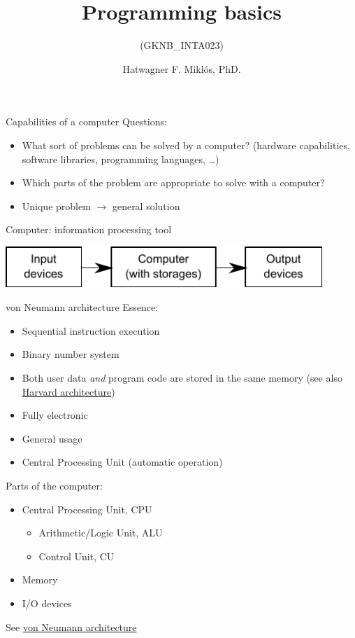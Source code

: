 \documentclass[usenames,dvipsnames,aspectratio=169]{beamer}
\title[Lecture 1.]{Programming basics}
\subtitle{(GKNB\_INTA023)}
\author{Hatwagner F. Miklós, PhD.}
\institute{Széchenyi István University, Győr, Hungary}
\newcommand{\hiv}[1]{{\color{hivatkozasszin}#1}}
\begin{document}
\begin{frame}[plain]
  \titlepage
\end{frame}

\begin{frame}{Capabilities of a computer}
  Questions:
  \begin{itemize}
    \item What sort of problems can be solved by a computer? (hardware capabilities, software libraries, programming languages, \dots)
    \item Which parts of the problem are appropriate to solve with a computer?
    \item Unique problem $\rightarrow$ general solution
  \end{itemize}
  \vfill
  Computer: information processing tool
  \begin{center}
    \includegraphics[width=0.9\textwidth,keepaspectratio=true]{./infoProcessing.pdf}
  \end{center}
\end{frame}

\begin{frame}{von Neumann architecture}
  Essence:
  \begin{itemize}
    \item Sequential instruction execution
    \item Binary number system
    \item Both user data \emph{and} program code are stored in the same memory 
    (see also \hiv{\href{https://en.wikipedia.org/wiki/Harvard_architecture}
      {Harvard architecture}})
    \item Fully electronic
    \item General usage
    \item Central Processing Unit (automatic operation)
  \end{itemize}
  Parts of the computer:
  \begin{itemize}
    \item Central Processing Unit, CPU
    \begin{itemize}
      \item Arithmetic/Logic Unit, ALU
      \item Control Unit, CU
    \end{itemize}
    \item Memory
    \item I/O devices
  \end{itemize}
  \vfill
  \tiny{See \hiv{\href{https://en.wikipedia.org/wiki/Von_Neumann_architecture}{von Neumann architecture}
}}
\end{frame}
\end{document}
